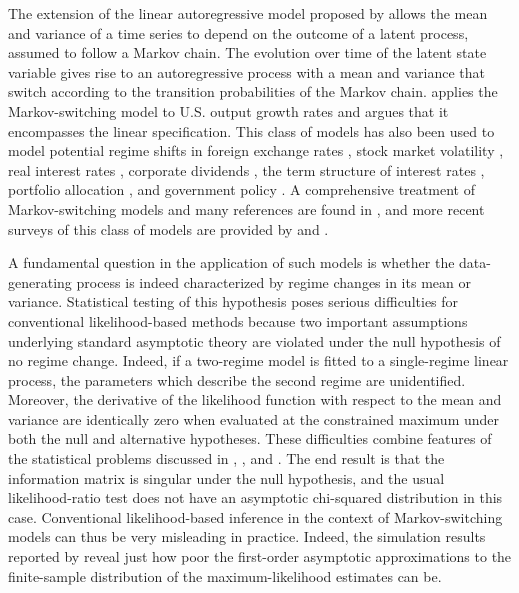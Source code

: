 \documentclass[11pt]{article}
\begin{document}
The extension of the linear autoregressive model proposed by %
\citet{Hamilton:1989} allows the mean and variance of a time series to
depend on the outcome of a latent process, assumed to follow a Markov chain.
The evolution over time of the latent state variable gives rise to an
autoregressive process with a mean and variance that switch according to the
transition probabilities of the Markov chain. \citet{Hamilton:1989} applies
the Markov-switching model to U.S. output growth rates and argues that it
encompasses the linear specification. This class of models has also been
used to model potential regime shifts in foreign exchange rates %
\citep{Engel-Hamilton:1990}, stock market volatility %
\citep{Hamilton-Susmel:1994}, real interest rates \citep{Garcia-Perron:1996}%
, corporate dividends \citep{Timmermann:2001}, the term structure of
interest rates \citep{Ang-Bekaert:2002a}, portfolio allocation %
\citep{Ang-Bekaert:2002b}, and government policy \citep{Davig:2004}. A
comprehensive treatment of Markov-switching models and many references are
found in \citet{Kim-Nelson:1999}, and more recent surveys of this class of
models are provided by \citet{Guidolin:2011} and \citet{Hamilton:2016}.

A fundamental question in the application of such models is whether the
data-generating process is indeed characterized by regime changes in its
mean or variance. Statistical testing of this hypothesis poses serious
difficulties for conventional likelihood-based methods because two important
assumptions underlying standard asymptotic theory are violated under the
null hypothesis of no regime change. Indeed, if a two-regime model is fitted
to a single-regime linear process, the parameters which describe the second
regime are unidentified. Moreover, the derivative of the likelihood function
with respect to the mean and variance are identically zero when evaluated at
the constrained maximum under both the null and alternative hypotheses.
These difficulties combine features of the statistical problems discussed in %
\citet{Davies:1977, Davies:1987}, \citet{Watson-Engle:1985}, and %
\citet{Lee-Chesher:1986}. The end result is that the information matrix is
singular under the null hypothesis, and the usual likelihood-ratio test does
not have an asymptotic chi-squared distribution in this case. Conventional
likelihood-based inference in the context of Markov-switching models can
thus be very misleading in practice. Indeed, the simulation results reported
by \citet{Psaradakis-Sola:1998} reveal just how poor the first-order
asymptotic approximations to the finite-sample distribution of the
maximum-likelihood estimates can be.
\end{document}

